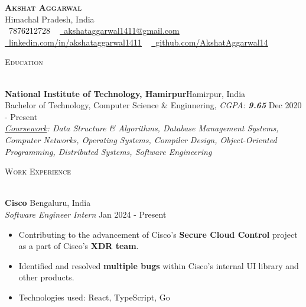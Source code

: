 \documentclass[a4paper]{article}
\newcommand{\tinyBulletSep} { \vspace{1.2mm} }
\newcommand{\bulletSep} { \vspace{1.5mm} }
\newcommand{\sectionSep} { \vspace{3mm} }
\newcommand{\lineunder} {
    \vspace*{-8pt} \\
    \hspace*{-15pt} \hrulefill \\
}
\newcommand{\header} [1] {
    {\hspace*{-18pt}\vspace*{6pt} {
        \fontfamily{qcs}\selectfont \large \scshape #1
    }}
    \vspace*{-6pt} \lineunder
    \vspace{1.1mm}
}
\newcommand{\educationItem}[6]{
    \textbf{#1}\hfill #2\\
    #3, \textit{#4} \hfill #5\\
    #6
}
\newcommand{\experienceItem}[5]{
    \textbf{#1} \hfill #2 \\
    \textit{#3} \hfill #4 \\
    #5
}
\newcommand{\link}[2]{
    {\fontfamily{lmtt}\selectfont\href{#1}{#2}}
}
\begin{document}

\begin{center}
    {\textbf{\Huge \scshape Akshat Aggarwal}} \\ \vspace{1pt}
    Himachal Pradesh, India \\
    \small \textcolor{black}{\raisebox{-0.1\height}\faPhone\
        7876212728} ~ \href{mailto:akshataggarwal1411@gmail.com}{{\raisebox{-0.2\height}\faEnvelope\  \underline{akshataggarwal1411@gmail.com}}} ~
    \href{https://www.linkedin.com/in/akshataggarwal1411/}{{\raisebox{-0.2\height}\faLinkedinSquare\ \underline{linkedin.com/in/akshataggarwal1411}}}  ~
    \href{https://github.com/AkshatAggarwal14}{{\raisebox{-0.2\height}\faGithub\ \underline{github.com/AkshatAggarwal14}}}
\end{center}

\vspace{-2mm}

\hypersetup {
    urlcolor     = blue, %
}


\header{Education}

\educationItem{National Institute of Technology, Hamirpur}{Hamirpur, India}{Bachelor of Technology, Computer Science \& Enginnering}{CGPA: \textbf{9.65}}{Dec 2020 - Present}{
    \tinyBulletSep
    \textit{\underline{Coursework}: Data Structure \& Algorithms, Database Management Systems, Computer Networks, Operating Systems, Compiler Design, Object-Oriented Programming, Distributed Systems, Software Engineering}

}


\sectionSep


\header{Work Experience}

\experienceItem{Cisco}{Bengaluru, India}{Software Engineer Intern}{Jan 2024 - Present}{
    \begin{itemize}
        \item Contributing to the advancement of Cisco's \textbf{Secure Cloud Control} project as a part of Cisco's \textbf{XDR team}.
        \item Identified and resolved \textbf{multiple bugs} within Cisco's internal UI library and other products.
        \item Technologies used: React, TypeScript, Go
    \end{itemize}
}
\bulletSep
\end{document}
